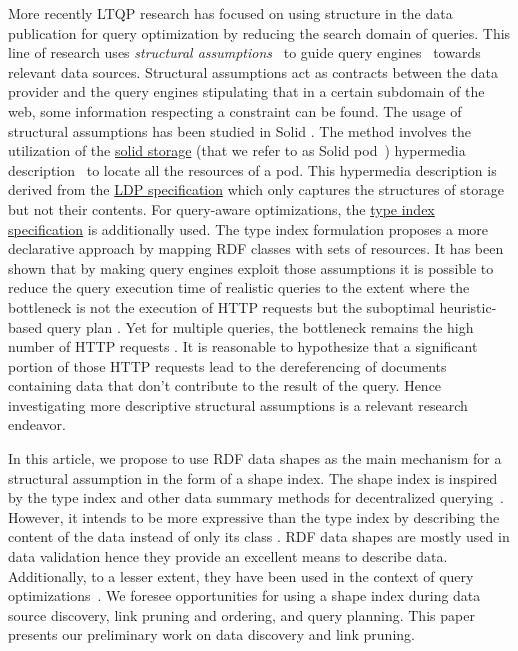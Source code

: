 More recently LTQP research has focused on using structure in the data publication for query optimization by reducing the search domain of queries.
This line of research uses \emph{structural assumptions}~\cite{Taelman2023} to guide query engines~\cite{verborgh2020guided} towards relevant data sources.
Structural assumptions act as contracts between the data provider and the query engines stipulating that in a certain subdomain of the web, some information respecting a constraint can be found.
The usage of structural assumptions has been studied in Solid \cite{Taelman2023}.
The method involves the utilization of the 
\href{https://solidproject.org/TR/protocol#resources}{solid storage} (that we refer to as Solid pod~\cite{Taelman2023}) hypermedia description~\cite{Fielding}
to locate all the resources of a pod. 
This hypermedia description is derived from the \href{https://www.w3.org/TR/ldp/}{LDP specification}
which only captures the structures of storage but not their contents.
For query-aware optimizations, the \href{https://solid.github.io/type-indexes/}{type index specification} is additionally used.
The type index formulation proposes a more declarative approach \cite{Taelman2017} by mapping RDF classes with sets of resources.
It has been shown that by making query engines exploit those assumptions it is possible to reduce the query execution time
of realistic queries to the extent where the bottleneck is not the execution of 
HTTP requests but the suboptimal heuristic-based query plan \cite{eschauzier_quweda_2023, Taelman2023}.
Yet for multiple queries, the bottleneck remains the high number of HTTP requests  \cite{eschauzier_quweda_2023}.
It is reasonable to hypothesize that a significant portion of those HTTP requests lead to the dereferencing of
documents containing data that don't contribute to the result of the query.
Hence investigating more descriptive structural assumptions is a relevant research endeavor.

In this article, we propose to use RDF data shapes as the main mechanism for a structural assumption in the form of a shape index.
The shape index is inspired by the type index and other data summary methods for decentralized querying~\cite{Stuckenschmidt2004,Goldman1997, Harth2010}.
However, it intends to be more expressive than the type index by describing the content of the data instead of only its class \cite{Taelman2017}.
RDF data shapes are mostly used in data validation \cite{Gayo2018a} hence they provide an excellent means to describe data.
Additionally, to a lesser extent, they have been used in the context of query optimizations~\cite{kashif2021}.
We foresee opportunities for using a shape index during data source discovery, link pruning and ordering, and query planning.
This paper presents our preliminary work on data discovery and link pruning.
